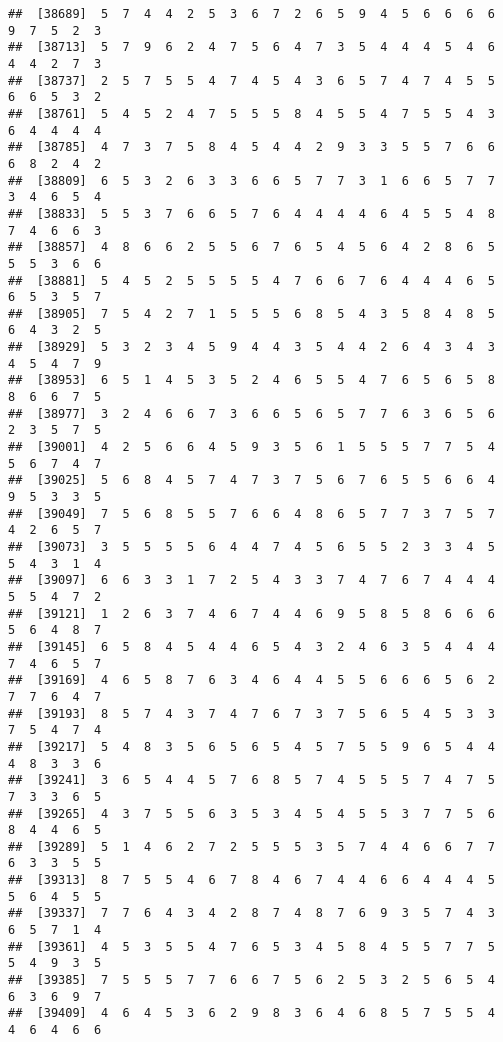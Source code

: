 \documentclass[
]{book}
\begin{document}
\begin{verbatim}
##  [38689]  5  7  4  4  2  5  3  6  7  2  6  5  9  4  5  6  6  6  6  9  7  5  2  3
##  [38713]  5  7  9  6  2  4  7  5  6  4  7  3  5  4  4  4  5  4  6  4  4  2  7  3
##  [38737]  2  5  7  5  5  4  7  4  5  4  3  6  5  7  4  7  4  5  5  6  6  5  3  2
##  [38761]  5  4  5  2  4  7  5  5  5  8  4  5  5  4  7  5  5  4  3  6  4  4  4  4
##  [38785]  4  7  3  7  5  8  4  5  4  4  2  9  3  3  5  5  7  6  6  6  8  2  4  2
##  [38809]  6  5  3  2  6  3  3  6  6  5  7  7  3  1  6  6  5  7  7  3  4  6  5  4
##  [38833]  5  5  3  7  6  6  5  7  6  4  4  4  4  6  4  5  5  4  8  7  4  6  6  3
##  [38857]  4  8  6  6  2  5  5  6  7  6  5  4  5  6  4  2  8  6  5  5  5  3  6  6
##  [38881]  5  4  5  2  5  5  5  5  4  7  6  6  7  6  4  4  4  6  5  6  5  3  5  7
##  [38905]  7  5  4  2  7  1  5  5  5  6  8  5  4  3  5  8  4  8  5  6  4  3  2  5
##  [38929]  5  3  2  3  4  5  9  4  4  3  5  4  4  2  6  4  3  4  3  4  5  4  7  9
##  [38953]  6  5  1  4  5  3  5  2  4  6  5  5  4  7  6  5  6  5  8  8  6  6  7  5
##  [38977]  3  2  4  6  6  7  3  6  6  5  6  5  7  7  6  3  6  5  6  2  3  5  7  5
##  [39001]  4  2  5  6  6  4  5  9  3  5  6  1  5  5  5  7  7  5  4  5  6  7  4  7
##  [39025]  5  6  8  4  5  7  4  7  3  7  5  6  7  6  5  5  6  6  4  9  5  3  3  5
##  [39049]  7  5  6  8  5  5  7  6  6  4  8  6  5  7  7  3  7  5  7  4  2  6  5  7
##  [39073]  3  5  5  5  5  6  4  4  7  4  5  6  5  5  2  3  3  4  5  5  4  3  1  4
##  [39097]  6  6  3  3  1  7  2  5  4  3  3  7  4  7  6  7  4  4  4  5  5  4  7  2
##  [39121]  1  2  6  3  7  4  6  7  4  4  6  9  5  8  5  8  6  6  6  5  6  4  8  7
##  [39145]  6  5  8  4  5  4  4  6  5  4  3  2  4  6  3  5  4  4  4  7  4  6  5  7
##  [39169]  4  6  5  8  7  6  3  4  6  4  4  5  5  6  6  6  5  6  2  7  7  6  4  7
##  [39193]  8  5  7  4  3  7  4  7  6  7  3  7  5  6  5  4  5  3  3  7  5  4  7  4
##  [39217]  5  4  8  3  5  6  5  6  5  4  5  7  5  5  9  6  5  4  4  4  8  3  3  6
##  [39241]  3  6  5  4  4  5  7  6  8  5  7  4  5  5  5  7  4  7  5  7  3  3  6  5
##  [39265]  4  3  7  5  5  6  3  5  3  4  5  4  5  5  3  7  7  5  6  8  4  4  6  5
##  [39289]  5  1  4  6  2  7  2  5  5  5  3  5  7  4  4  6  6  7  7  6  3  3  5  5
##  [39313]  8  7  5  5  4  6  7  8  4  6  7  4  4  6  6  4  4  4  5  5  6  4  5  5
##  [39337]  7  7  6  4  3  4  2  8  7  4  8  7  6  9  3  5  7  4  3  6  5  7  1  4
##  [39361]  4  5  3  5  5  4  7  6  5  3  4  5  8  4  5  5  7  7  5  5  4  9  3  5
##  [39385]  7  5  5  5  7  7  6  6  7  5  6  2  5  3  2  5  6  5  4  6  3  6  9  7
##  [39409]  4  6  4  5  3  6  2  9  8  3  6  4  6  8  5  7  5  5  4  4  6  4  6  6

\end{verbatim}
\end{document}
